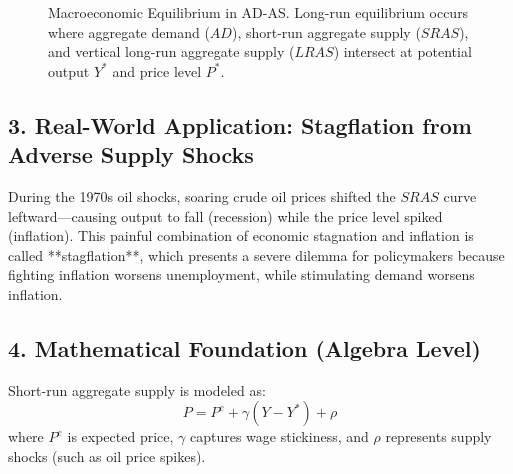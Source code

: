 \documentclass[11pt,letterpaper]{article}
\begin{document}
\begin{figure}[htbp]
\centering
{}
\caption{Macroeconomic Equilibrium in AD-AS. Long-run equilibrium occurs where aggregate demand ($AD$), short-run aggregate supply ($SRAS$), and vertical long-run aggregate supply ($LRAS$) intersect at potential output $Y^*$ and price level $P^*$.}
\label{fig:adas_equilibrium}
\end{figure}

\subsection*{3. Real-World Application: Stagflation from Adverse Supply Shocks}
During the 1970s oil shocks, soaring crude oil prices shifted the $SRAS$ curve leftward—causing output to fall (recession) while the price level spiked (inflation). This painful combination of economic stagnation and inflation is called **stagflation**, which presents a severe dilemma for policymakers because fighting inflation worsens unemployment, while stimulating demand worsens inflation.

\subsection*{4. Mathematical Foundation (Algebra Level)}
Short-run aggregate supply is modeled as:
\begin{equation}
P = P^e + \gamma(Y - Y^*) + \rho
\end{equation}
where $P^e$ is expected price, $\gamma$ captures wage stickiness, and $\rho$ represents supply shocks (such as oil price spikes).
\end{document}
